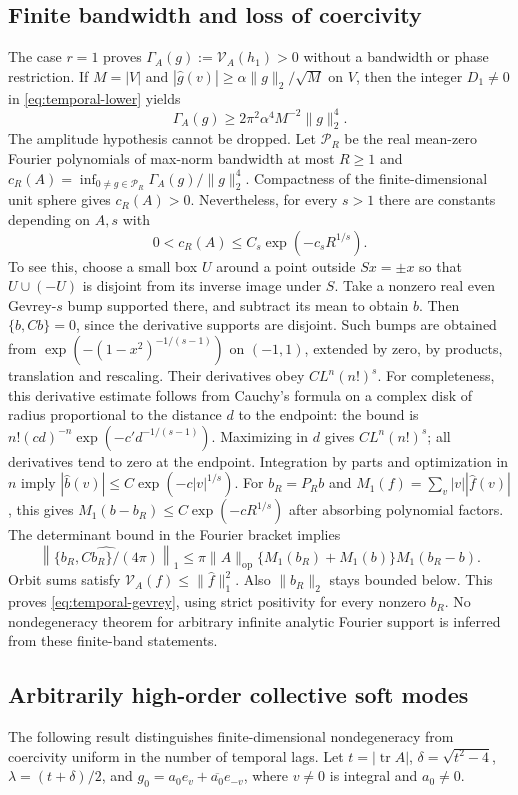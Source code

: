 \subsection{Finite bandwidth and loss of coercivity}
The case $r=1$ proves $\Gamma_A(g):=\mathcal V_A(h_1)>0$ without a
bandwidth or phase restriction. If $M=|V|$ and
$|\widehat g(v)|\ge\alpha\|g\|_2/\sqrt M$ on $V$, then the integer
$D_1\ne0$ in \eqref{eq:temporal-lower} yields
\[
 \Gamma_A(g)\ge2\pi^2\alpha^4M^{-2}\|g\|_2^4.
\]
The amplitude hypothesis cannot be dropped. Let $\mathcal P_R$ be the real
mean-zero Fourier polynomials of max-norm bandwidth at most $R\ge1$ and
$c_R(A)=\inf_{0\ne g\in\mathcal P_R}\Gamma_A(g)/\|g\|_2^4$.
Compactness of the finite-dimensional unit sphere gives $c_R(A)>0$.
Nevertheless, for every $s>1$ there are constants depending on $A,s$ with
\begin{equation}\label{eq:temporal-gevrey}
 0<c_R(A)\le C_s\exp(-c_sR^{1/s}).
\end{equation}
To see this, choose a small box $U$ around a point outside $Sx=\pm x$ so
that $U\cup(-U)$ is disjoint from its inverse image under $S$.
Take a nonzero real even Gevrey-$s$ bump supported there, and subtract its
mean to obtain $b$. Then $\{b,Cb\}=0$, since the derivative supports are
disjoint. Such bumps are obtained from
$\exp(-(1-x^2)^{-1/(s-1)})$ on $(-1,1)$, extended by zero, by products,
translation and rescaling. Their derivatives obey $C L^n(n!)^s$.
For completeness, this derivative estimate follows from Cauchy's formula on
a complex disk of radius proportional to the distance $d$ to the endpoint:
the bound is $n! (c d)^{-n}\exp(-c'd^{-1/(s-1)})$. Maximizing in $d$
gives $C L^n(n!)^s$; all derivatives tend to zero at the endpoint.
Integration by parts and optimization in $n$ imply
$|\widehat b(v)|\le C\exp(-c|v|^{1/s})$.
For $b_R=P_Rb$ and $M_1(f)=\sum_v|v||\widehat f(v)|$, this gives
$M_1(b-b_R)\le C\exp(-cR^{1/s})$ after absorbing polynomial factors.
The determinant bound in the Fourier bracket implies
\[
 \left\|\widehat{\{b_R,Cb_R\}/(4\pi)}\right\|_1
 \le\pi\|A\|_{\mathrm{op}}
       \{M_1(b_R)+M_1(b)\}M_1(b_R-b).
\]
Orbit sums satisfy $\mathcal V_A(f)\le\|\widehat f\|_1^2$.
Also $\|b_R\|_2$ stays bounded below. This proves
\eqref{eq:temporal-gevrey}, using strict positivity for every nonzero $b_R$.
No nondegeneracy theorem for arbitrary infinite analytic Fourier support is
inferred from these finite-band statements.

\subsection{Arbitrarily high-order collective soft modes}
The following result distinguishes finite-dimensional nondegeneracy from
coercivity uniform in the number of temporal lags.
Let $t=|\operatorname{tr}A|$, $\delta=\sqrt{t^2-4}$,
$\lambda=(t+\delta)/2$, and $g_0=a_0e_v+\overline{a_0}e_{-v}$,
where $v\ne0$ is integral and $a_0\ne0$.

